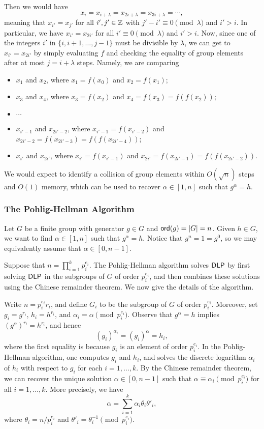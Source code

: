 Then we would have 
\[ x_i = x_{i+\lambda} = x_{2i+\lambda} = x_{3i+\lambda} = \cdots, \]
meaning that $x_{i'} = x_{j'}$ for all $i', j' \in \mathbb{Z}$ with $j' - i' \equiv 0 \pmod 
\lambda$ and $i' > i$. In particular, we have $x_{i'} = x_{2i'}$ for all 
$i' \equiv 0 \pmod \lambda$ and $i' > i$. Now, since one of the integers $i'$ 
in $\{i, i+1, \dots, j-1\}$ must be divisible by $\lambda$, we can get to 
$x_{i'} = x_{2i'}$ by simply evaluating $f$ and checking the equality of 
group elements after at most $j = i+\lambda$ steps. Namely, we are comparing 
\begin{itemize}
      \item $x_1$ and $x_2$, where $x_1 = f(x_0)$ and $x_2 = f(x_1)$; 
      \item $x_3$ and $x_4$, where $x_3 = f(x_2)$ and $x_4 = f(x_3) = f(f(x_2))$;
      \item $\cdots$
      \item $x_{i'-1}$ and $x_{2i'-2}$, where $x_{i'-1} = f(x_{i'-2})$ and 
            $x_{2i'-2} = f(x_{2i'-3}) = f(f(x_{2i'-4}))$; 
      \item $x_{i'}$ and $x_{2i'}$, where $x_{i'} = f(x_{i'-1})$ and 
            $x_{2i'} = f(x_{2i'-1}) = f(f(x_{2i'-2}))$. 
\end{itemize}
We would expect to identify a collision of group elements within $O(\sqrt n)$ 
steps and $O(1)$ memory, which can be used to recover $\alpha \in [1, n]$ 
such that $g^\alpha = h$. 

\subsubsection{The Pohlig-Hellman Algorithm}
Let $G$ be a finite group with generator $g \in G$ and ${\sf ord}(g) = |G| = n$. 
Given $h \in G$, we want to find $\alpha \in [1, n]$ such that $g^\alpha = h$. 
Notice that $g^n = 1 = g^0$, so we may equivalently assume that $\alpha 
\in [0, n-1]$. 

Suppose that $n = \prod_{i=1}^k p_i^{e_i}$. The Pohlig-Hellman algorithm 
\cite{1055817} solves ${\sf DLP}$ by first solving ${\sf DLP}$ in the subgroups of $G$ 
of order $p_i^{e_i}$, and then combines these solutions using the Chinese 
remainder theorem. We now give the details of the algorithm. 

Write $n = p_i^{e_i} r_i$, and define $G_i$ to be the subgroup of $G$ of order 
$p_i^{e_i}$. Moreover, set $g_i = g^{r_i}$, $h_i = h^{r_i}$, and 
$\alpha_i = \alpha \pmod{p_i^{e_i}}$. Observe that $g^\alpha = h$ implies 
$(g^\alpha)^{r_i} = h^{r_i}$, and hence 
\[ (g_i)^{\alpha_i} = (g_i)^\alpha = h_i, \] 
where the first equality is because $g_i$ is an element of order $p_i^{e_i}$. 
In the Pohlig-Hellman algorithm, one computes $g_i$ and $h_i$, and solves the 
discrete logarithm $\alpha_i$ of $h_i$ with respect to $g_i$ for each 
$i = 1, \dots, k$. By the Chinese remainder theorem, we can recover the unique 
solution $\alpha \in [0, n-1]$ such that $\alpha \equiv \alpha_i 
\pmod{p_i^{e_i}}$ for all $i = 1, \dots, k$. More precisely, we have 
\[ \alpha = \sum_{i=1}^k \alpha_i \theta_i \theta'_i, \] 
where $\theta_i = n/p_i^{e_i}$ and $\theta'_i = \theta_i^{-1} \pmod{p_i^{e_i}}$. 

